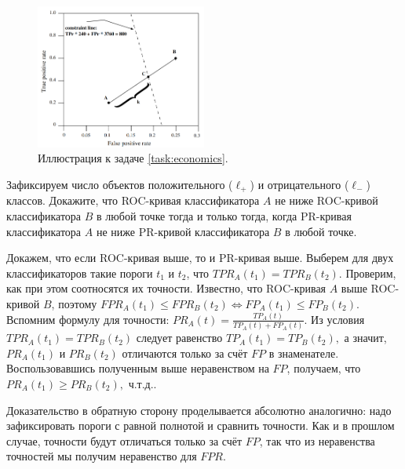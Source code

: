 \documentclass[12pt,a4paper]{article}
\begin{document}
\begin{esSolution}
\begin{figure}[th!]
	\centering
	\includegraphics[width=0.5\textwidth]{./img/ml_roc_cross.png}
	\caption{Иллюстрация к задаче \ref{task:economics}.}
 \label{fig:const}
\end{figure}

\end{esSolution}

\begin{vkProblem}
Зафиксируем число объектов положительного ($\ell_{+}$) и отрицательного ($\ell_{-}$) классов.
Докажите, что ROC-кривая классификатора $A$ не ниже ROC-кривой классификатора $B$ в любой точке тогда и только тогда, когда PR-кривая классификатора $A$ не ниже PR-кривой классификатора $B$ в любой точке.
\end{vkProblem}

\begin{esSolution}
Докажем, что если ROC-кривая выше, то и PR-кривая выше.
Выберем для двух классификаторов такие пороги $t_1$ и $t_2$, что $TPR_A(t_1) = TPR_B(t_2).$
Проверим, как при этом соотносятся их точности.
Известно, что ROC-кривая $A$ выше ROC-кривой $B$, поэтому $FPR_A(t_1) \leqslant FPR_B(t_2) \Leftrightarrow FP_A(t_1) \leqslant FP_B(t_2).$
Вспомним формулу для точности: $PR_A(t) = \frac{TP_A(t)}{TP_A(t) + FP_A(t)}.$
Из условия $TPR_A(t_1) = TPR_B(t_2)$ следует равенство $TP_A(t_1) = TP_B(t_2),$ а значит, $PR_A(t_1)$ и $PR_B(t_2)$ отличаются только за счёт $FP$ в знаменателе.
Воспользовавшись полученным выше неравенством на $FP$, получаем, что $PR_A(t_1) \geqslant PR_B(t_2),$ ч.т.д.. 

Доказательство в обратную сторону проделывается абсолютно аналогично: надо зафиксировать пороги с равной полнотой и сравнить точности.
Как и в прошлом случае, точности будут отличаться только за счёт $FP$, так что из неравенства точностей мы получим неравенство для $FPR$.
\end{esSolution}
\end{document}
